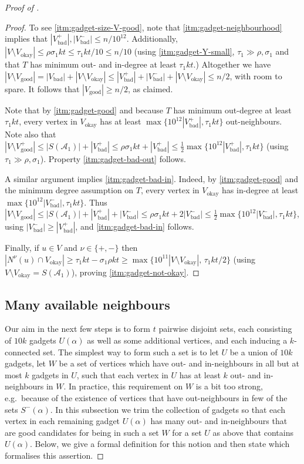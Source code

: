 \documentclass[english]{article}
\theoremstyle{plain}
\theoremstyle{remark}
\def \Sm {S^-}
\def \Vgp {V_{\good}^+}
\def \Vbp {V_{\bad}^+}
\def \Vbm {V_{\bad}^-}
\def \Vgp {V_{\good}^+}
\def \Vo {V_{\okay}}
\def \Vg {V_{\good}}
\def \Vb {V_{\bad}}
\newcommand{\A}{\mathcal{A}}
\DeclareMathOperator{\bad}{bad}
\DeclareMathOperator{\good}{good}
\DeclareMathOperator{\okay}{okay}
\begin{document}
\begin{proof}[Proof of ]
	\begin{proof}
		To see \ref{itm:gadget-size-V-good}, note that \ref{itm:gadget-neighbourhood} implies that $|\Vbp|, |\Vbm| \le n/10^{12}$. Additionally, $|V \setminus \Vo| \le \rho \sigma_1 kt \le \tau_1 kt / 10 \le n/10$ (using \ref{itm:gadget-Y-small}, $\tau_1 \gg \rho, \sigma_1$ and that $T$ has minimum out- and in-degree at least $\tau_1 kt$.) Altogether we have $|V \setminus \Vg| = |\Vb| + |V \setminus \Vo| \le |\Vbp| + |\Vbm| + |V \setminus \Vo| \le n/2$, with room to spare. It follows that $|\Vg| \ge n/2$, as claimed.

		Note that by \ref{itm:gadget-good} and because $T$ has minimum out-degree at least $\tau_1 kt$, every vertex in $\Vo$ has at least $\max\{10^{12} |\Vbp|, \tau_1 kt\}$ out-neighbours.
		Note also that $|V \setminus \Vgp| \le |S(\A_1)| + |\Vbp| \le \rho \sigma_1 kt + |\Vbp| \le \frac{1}{2}\max\{10^{12}|\Vbp|, \tau_1 kt\}$ (using $\tau_1 \gg \rho, \sigma_1$). Property \ref{itm:gadget-bad-out} follows.

		A similar argument implies \ref{itm:gadget-bad-in}. Indeed, by \ref{itm:gadget-good} and the minimum degree assumption on $T$, every vertex in $\Vo$ has in-degree at least $\max\{10^{12}|\Vbm|, \tau_1 kt\}$. Thus $|V \setminus \Vg| \le |S(\A_1)| + |\Vbp| + |\Vbm| \le \rho \sigma_1 kt + 2|\Vbm| \le \frac{1}{2} \max\{10^{12}|\Vbm|, \tau_1 kt\}$, using $|\Vbm| \ge |\Vbp|$, and \ref{itm:gadget-bad-in} follows.

		Finally, if $u \in V$ and $\nu \in \{+, -\}$ then $|N^{\nu}(u) \cap \Vo| \ge \tau_1 kt - \sigma_1 \rho kt \ge \max\{10^{11}|V \setminus \Vo|, \, \tau_1 kt/2\}$ (using $V \setminus \Vo = S(\A_1)$), proving \ref{itm:gadget-not-okay}.
	\end{proof}

	\subsection{Many available neighbours} \label{subsec:available}

		Our aim in the next few steps is to form $t$ pairwise disjoint sets, each consisting of $10k$ gadgets $U(\alpha)$ as well as some additional vertices, and each inducing a $k$-connected set. The simplest way to form such a set is to let $U$ be a union of $10k$ gadgets, let $W$ be a set of vertices which have out- and in-neighbours in all but at most $k$ gadgets in $U$, such that each vertex in $U$ has at least $k$ out- and in-neighbours in $W$. In practice, this requirement on $W$ is a bit too strong, e.g.\ because of the existence of vertices that have out-neighbours in few of the sets $\Sm(\alpha)$. In this subsection we trim the collection of gadgets so that each vertex in each remaining gadget $U(\alpha)$ has many out- and in-neighbours that are good candidates for being in such 
		a set $W$ for a set $U$ as above that contains $U(\alpha)$. Below, we give a formal definition for this notion and then state  which formalises this assertion.


\end{proof}
\end{document}
